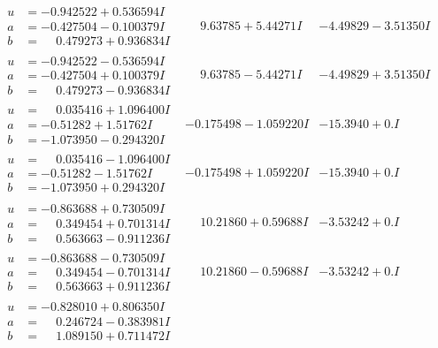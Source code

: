 \documentclass[1p]{elsarticle_modified}
\theoremstyle{definition}
\begin{document}
$$\begin{array}{c|c|c}
\begin{aligned}
u &= -0.942522 + 0.536594 I \\
a &= -0.427504 - 0.100379 I \\
b &= \phantom{-}0.479273 + 0.936834 I\end{aligned}
 & \phantom{-}9.63785 + 5.44271 I & -4.49829 - 3.51350 I \\ \hline\begin{aligned}
u &= -0.942522 - 0.536594 I \\
a &= -0.427504 + 0.100379 I \\
b &= \phantom{-}0.479273 - 0.936834 I\end{aligned}
 & \phantom{-}9.63785 - 5.44271 I & -4.49829 + 3.51350 I \\ \hline\begin{aligned}
u &= \phantom{-}0.035416 + 1.096400 I \\
a &= -0.51282 + 1.51762 I \\
b &= -1.073950 - 0.294320 I\end{aligned}
 & -0.175498 - 1.059220 I & -15.3940 + 0. I\phantom{ +0.000000I} \\ \hline\begin{aligned}
u &= \phantom{-}0.035416 - 1.096400 I \\
a &= -0.51282 - 1.51762 I \\
b &= -1.073950 + 0.294320 I\end{aligned}
 & -0.175498 + 1.059220 I & -15.3940 + 0. I\phantom{ +0.000000I} \\ \hline\begin{aligned}
u &= -0.863688 + 0.730509 I \\
a &= \phantom{-}0.349454 + 0.701314 I \\
b &= \phantom{-}0.563663 - 0.911236 I\end{aligned}
 & \phantom{-}10.21860 + 0.59688 I & -3.53242 + 0. I\phantom{ +0.000000I} \\ \hline\begin{aligned}
u &= -0.863688 - 0.730509 I \\
a &= \phantom{-}0.349454 - 0.701314 I \\
b &= \phantom{-}0.563663 + 0.911236 I\end{aligned}
 & \phantom{-}10.21860 - 0.59688 I & -3.53242 + 0. I\phantom{ +0.000000I} \\ \hline\begin{aligned}
u &= -0.828010 + 0.806350 I \\
a &= \phantom{-}0.246724 - 0.383981 I \\
b &= \phantom{-}1.089150 + 0.711472 I\end{aligned}

\end{array}$$
\end{document}
